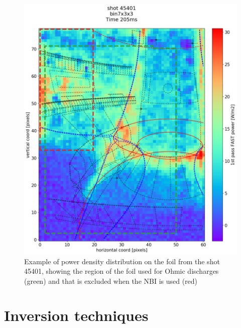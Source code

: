 \begin{figure}
	\centering
	\includegraphics[trim={0 0 0 80},clip,width=0.75\linewidth]{Chapters/chapter2/figs/IRVB-MASTU_shot-45401_export_80.png}
	\caption{Example of power density distribution on the foil from the shot 45401, showing the region of the foil used for Ohmic discharges (green) and that is excluded when the NBI is used (red)}
	\label{fig:foil_excluded}
\end{figure}

\section{Inversion techniques}
